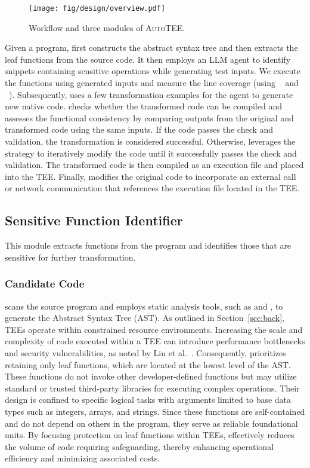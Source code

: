 \begin{figure*}[ht]
    \centering
    \texttt{[image: fig/design/overview.pdf]}
    \caption{Workflow and three modules of \textsc{AutoTEE}. }
    \label{fig:system:overview}
\end{figure*}

Given a program, \system first constructs the abstract syntax tree and then extracts the leaf functions from the source code.
It then employs an LLM agent to identify snippets containing sensitive operations while generating test inputs.
We execute the functions using generated inputs and measure the line coverage (using ~\cite{jacoco} and ~\cite{pytestcov}).
Subsequently, \system uses a few transformation examples for the agent to generate new native code.
\system checks whether the transformed code can be compiled and assesses the functional consistency by comparing outputs from the original and transformed code using the same inputs.
If the code passes the check and validation, the transformation is considered successful.
Otherwise, \system leverages the  strategy to iteratively modify the code until it successfully passes the check and validation.
The transformed code is then compiled as an execution file and placed into the TEE.
Finally, \system modifies the original code to incorporate an external call or network communication that references the execution file located in the TEE.

\subsection{Sensitive Function Identifier}
This module extracts functions from the program and identifies those that are sensitive for further transformation.

\subsubsection{Candidate Code}
\system scans the source program and employs static analysis tools, such as  and , to generate the Abstract Syntax Tree (AST). 
As outlined in Section~\ref{sec:back}, TEEs operate within constrained resource environments. Increasing the scale and complexity of code executed within a TEE can introduce performance bottlenecks and security vulnerabilities, as noted by Liu et al.~\cite{LiuDT22jss}. 
Consequently, \system prioritizes retaining only leaf functions, which are located at the lowest level of the AST. 
These functions do not invoke other developer-defined functions but may utilize standard or trusted third-party libraries for executing complex operations. 
Their design is confined to specific logical tasks with arguments limited to base data types such as integers, arrays, and strings. 
Since these functions are self-contained and do not depend on others in the program, they serve as reliable foundational units. 
By focusing protection on leaf functions within TEEs, \system effectively reduces the volume of code requiring safeguarding, thereby enhancing operational efficiency and minimizing associated costs.


